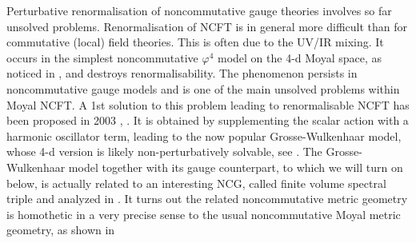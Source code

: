 \documentclass[10pt]{book}
\theoremstyle{break}
\begin{document}
Perturbative renormalisation of noncommutative gauge theories involves so far unsolved problems. Renormalisation of NCFT is in general more difficult than for commutative (local) field theories. This is often due to the UV/IR mixing. It occurs in the simplest noncommutative $\varphi^4$ model on the 4-d Moyal space, as noticed in %
, and destroys renormalisability. The phenomenon persists in noncommutative gauge models and is one of the main unsolved problems within Moyal NCFT. A 1st solution to this problem leading to renormalisable NCFT has been proposed in 2003 %
, %
. It is obtained by supplementing the scalar action with a harmonic oscillator term, leading to the now popular Grosse-Wulkenhaar model, whose 4-d version is likely non-perturbatively solvable, see %
. The Grosse-Wulkenhaar model together with its gauge counterpart, to which we will turn on below, is actually related to an interesting NCG, called finite volume spectral triple and analyzed in %
. It turns out the related noncommutative metric geometry is homothetic in a very precise sense to the usual noncommutative Moyal metric geometry, as shown in %
\par
\end{document}
